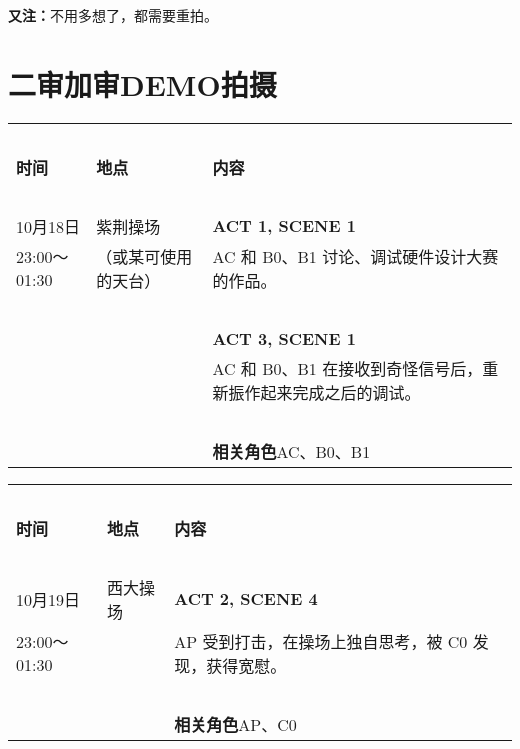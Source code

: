 \documentclass[10pt, a5paper, oneside]{memoir}
\begin{document}
{   \vspace{-0.5\baselineskip}
    \kai \small
    \textbf{又注：}不用多想了，都需要重拍。
}

\clearpage

\section*{二审加审DEMO拍摄}

\begin{table}[!ht]
    \raggedright
    \begin{tabular}{p{}p{}p{}}
        \toprule
        ~ & & \\[-0.7em]
        \textbf{时间} & \textbf{地点} & \textbf{内容} \\[0.3em]
        \midrule
        ~ & & \\[-0.7em]
        10月18日        & 紫荆操场 & \textbf{ACT 1, SCENE 1} \\[0.3em]
        23:00～01:30    & （或某可使用的天台） & 
            AC 和 B0、B1 讨论、调试硬件设计大赛的作品。
        \\
        ~ & & \\[-0.7em]
        ~ & ~ & \textbf{ACT 3, SCENE 1} \\[0.3em]
        ~ & ~ & 
            AC 和 B0、B1 在接收到奇怪信号后，重新振作起来完成之后的调试。
        \\
        ~ & & \\[-0.7em]
        ~ & ~ & \textbf{相关角色\quad}AC、B0、B1 \\[0.3em]
        \bottomrule
    \end{tabular}
\end{table}

\begin{table}[!ht]
    \raggedright
    \begin{tabular}{p{}p{}p{}}
        \toprule
        ~ & & \\[-0.7em]
        \textbf{时间} & \textbf{地点} & \textbf{内容} \\[0.3em]
        \midrule
        ~ & & \\[-0.7em]
        10月19日        & 西大操场 & \textbf{ACT 2, SCENE 4} \\[0.3em]
        23:00～01:30    & ~ & 
            AP 受到打击，在操场上独自思考，被 C0 发现，获得宽慰。
        \\
        ~ & & \\[-0.7em]
        ~ & ~ & \textbf{相关角色\quad}AP、C0 \\[0.3em]
        \bottomrule
    \end{tabular}
\end{table}
\end{document}

